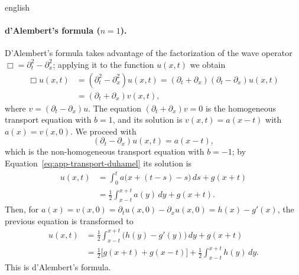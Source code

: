 \documentclass[0000.tex]{subfiles}
\begin{document}
\begin{hyphenrules}{english}
\paragraph{d'Alembert's formula ($n=1$).}
D'Alembert's formula takes advantage of the factorization of the wave operator
$\Box=\partial_t^2-\partial_x^2$; applying it to the function $u(x,t)$ we obtain
\begin{align}
  \Box u(x,t)&=(\partial_t^2-\partial_x^2)u(x,t)=(\partial_t+\partial_x)(\partial_t-\partial_x)u(x,t) \label{eq:dalembert-1}\\
             &=(\partial_t+\partial_x)v(x,t), \label{eq:dalembert-2}
\end{align}
where $v=(\partial_t-\partial_x)u$. The equation $(\partial_t+\partial_x)v=0$ is the homogeneous
transport equation with $b=1$, and its solution is $v(x,t)=a(x-t)$ with $a(x)=v(x,0)$. We proceed with
\begin{equation}
  (\partial_t-\partial_x)u(x,t)=a(x-t),
  \label{eq:dalembert-3}
\end{equation}
which is the non-homogeneous transport equation with $b=-1$; by Equation~\eqref{eq:app-transport-duhamel} its
solution is
\begin{align}
  u(x,t)&=\int_0^t a\big(x+(t-s)-s\big)\,d s+g(x+t) \label{eq:dalembert-4}\\
        &=\frac12\int_{x-t}^{x+t}a(y)\,d y+g(x+t). \label{eq:dalembert-5}
\end{align}
Then, for $a(x)=v(x,0)=\partial_t u(x,0)-\partial_x u(x,0)=h(x)-g'(x)$, the previous equation is
transformed to
\begin{align}
  u(x,t)&=\frac12\int_{x-t}^{x+t}\big(h(y)-g'(y)\big)\,d y+g(x+t) \label{eq:dalembert-6}\\
        &=\frac12\big[g(x+t)+g(x-t)\big]+\frac12\int_{x-t}^{x+t}h(y)\,d y. \label{eq:app-dalembert}
\end{align}
This is d'Alembert's formula.


\end{hyphenrules}
\end{document}
